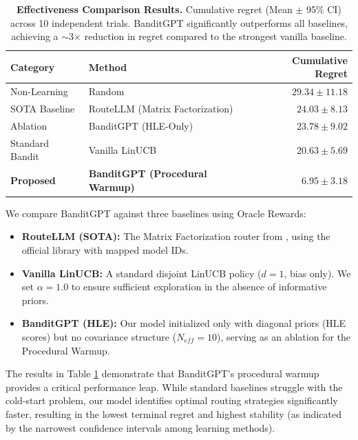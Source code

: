 \begin{table}[h]
\centering
\caption{\textbf{Effectiveness Comparison Results.} Cumulative regret (Mean $\pm$ 95\% CI) across 10 independent trials. BanditGPT significantly outperforms all baselines, achieving a $\sim$3$\times$ reduction in regret compared to the strongest vanilla baseline.}
\label{tab:effectiveness_results}
\begin{tabular}{llr}
\hline
\textbf{Category} & \textbf{Method} & \textbf{Cumulative Regret} \\ \hline
Non-Learning & Random & $29.34 \pm 11.18$ \\
SOTA Baseline & RouteLLM (Matrix Factorization) & $24.03 \pm 8.13$ \\
Ablation & BanditGPT (HLE-Only) & $23.78 \pm 9.02$ \\
Standard Bandit & Vanilla LinUCB & $20.63 \pm 5.69$ \\
\textbf{Proposed} & \textbf{BanditGPT (Procedural Warmup)} & $\mathbf{6.95 \pm 3.18}$ \\ \hline
\end{tabular}
\end{table}

We compare BanditGPT against three baselines using Oracle Rewards:
\begin{itemize}
    \item \textbf{RouteLLM (SOTA):} The Matrix Factorization router from \cite{ong2024routellm}, using the official library with mapped model IDs.
    \item \textbf{Vanilla LinUCB:} A standard disjoint LinUCB policy ($d=1$, bias only). We set $\alpha=1.0$ to ensure sufficient exploration in the absence of informative priors.
    \item \textbf{BanditGPT (HLE):} Our model initialized only with diagonal priors (HLE scores) but no covariance structure ($N_{eff}=10$), serving as an ablation for the Procedural Warmup.
\end{itemize}

The results in Table \ref{tab:effectiveness_results} demonstrate that BanditGPT's procedural warmup provides a critical performance leap. While standard baselines struggle with the cold-start problem, our model identifies optimal routing strategies significantly faster, resulting in the lowest terminal regret and highest stability (as indicated by the narrowest confidence intervals among learning methods).
